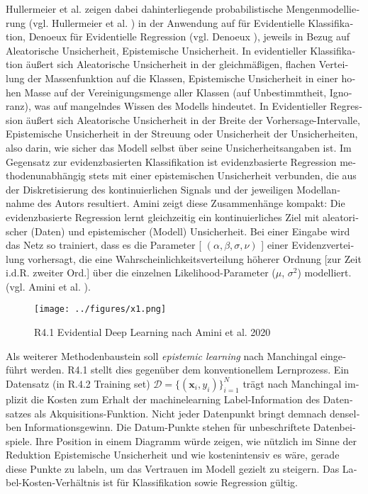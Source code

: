 \begin{otherlanguage}{ngerman}
Hullermeier et al. zeigen dabei dahinterliegende probabilistische Mengenmodellierung (vgl. Hullermeier et al. \parencite{javanmardi2024conformalized}) in der Anwendung auf für Evidentielle Klassifikation, Denoeux für Evidentielle Regression (vgl. Denoeux \parencite{denoeux2022evidential}), jeweils in Bezug auf \gls{Aleatorische Unsicherheit}, \gls{Epistemische Unsicherheit}. In evidentieller Klassifikation äußert sich \gls{Aleatorische Unsicherheit} in der gleichmäßigen, flachen Verteilung der Massenfunktion auf die Klassen, \gls{Epistemische Unsicherheit} in einer hohen Masse auf der Vereinigungsmenge aller Klassen (auf Unbestimmtheit, Ignoranz), was auf mangelndes Wissen des Modells hindeutet. In Evidentieller Regression äußert sich \gls{Aleatorische Unsicherheit} in der Breite der Vorhersage-Intervalle, \gls{Epistemische Unsicherheit} in der Streuung oder \glqq{}Unsicherheit der Unsicherheiten\grqq{}, also darin, wie sicher das Modell selbst über seine Unsicherheitsangaben ist. Im Gegensatz zur evidenzbasierten Klassifikation ist evidenzbasierte Regression methodenunabhängig stets mit einer epistemischen Unsicherheit verbunden, die aus der Diskretisierung des kontinuierlichen Signals und der jeweiligen Modellannahme des Autors resultiert. Amini zeigt diese Zusammenhänge kompakt: \glqq Die evidenzbasierte Regression lernt gleichzeitig ein kontinuierliches Ziel mit aleatorischer (Daten) und epistemischer (Modell) Unsicherheit. Bei einer Eingabe wird das Netz so trainiert, dass es die Parameter [ $(\alpha, \beta, \sigma, \nu)$ ] einer Evidenzverteilung vorhersagt, die eine Wahrscheinlichkeitsverteilung höherer Ordnung [zur Zeit i.d.R. zweiter Ord.] über die einzelnen Likelihood-Parameter ($\mu$, $\sigma^{2}$) modelliert.\grqq{} (vgl. Amini et al. \parencite[{S.1, Abbildung 1}]{amini2020deep}).

\begin{figure}[!ht]
  \centering
  \texttt{[image: ../figures/x1.png]}
  \caption{R4.1 \glqq Evidential Deep Learning\grqq{} nach Amini et al. 2020}
\end{figure}

Als weiterer Methodenbaustein soll \glqq{}\textit{epistemic learning}\grqq{} nach Manchingal eingeführt werden. R4.1 stellt dies gegenüber dem konventionellem Lernprozess. Ein Datensatz (in R.4.2 \glqq{}Training set\grqq{}) $\mathcal{D} = \{ (\mathbf{x}_i, y_i) \}_{i=1}^N$ trägt nach Manchingal implizit die Kosten zum Erhalt der \gls{machinelearning} Label-Information des Datensatzes als Akquisitions-Funktion. Nicht jeder Datenpunkt bringt demnach denselben Informationsgewinn. Die \glqq{}Datum\grqq{}-Punkte stehen für unbeschriftete Datenbeispiele. Ihre Position in einem Diagramm würde zeigen, wie nützlich im Sinne der Reduktion \gls{Epistemische Unsicherheit} und wie kostenintensiv es wäre, gerade diese Punkte zu labeln, um das Vertrauen im Modell gezielt zu steigern. Das Label-Kosten-Verhältnis ist für Klassifikation sowie Regression gültig. 


\end{otherlanguage}
